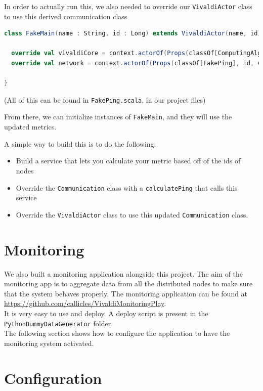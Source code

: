\documentclass[11pt,a4paper]{article}
\begin{document}
In order to actually run this, we also needed to override our \verb|VivaldiActor| class to use this derived communication class

\begin{lstlisting}[language=scala]
class FakeMain(name : String, id : Long) extends VivaldiActor(name, id) {

  override val vivaldiCore = context.actorOf(Props(classOf[ComputingAlgorithm], self, deltaConf), "VivaldiCore"+id)
  override val network = context.actorOf(Props(classOf[FakePing], id, vivaldiCore, self), "Network"+id)

}
\end{lstlisting}

(All of this can be found in \verb|FakePing.scala|, in our project files)

From there, we can initialize instances of \verb|FakeMain|, and they will use the updated metrics.

A simple way to build this is to do the following: 
\begin{itemize}
\item Build a service that lets you calculate your metric based off of the ids of nodes 
\item Override the \verb|Communication| class with a \verb|calculatePing| that calls this service
\item Override the \verb|VivaldiActor| class to use this updated \verb|Communication| class.
\end{itemize}

\section{Monitoring}
We also built a monitoring application alongside this project. The aim of the monitoring app is to aggregate data from all the distributed nodes to make sure that the system behaves properly. The monitoring application can be found at \href{https://github.com/callicles/VivaldiMonitoringPlay}{https://github.com/callicles/VivaldiMonitoringPlay}.\\

It is very easy to use and deploy. A deploy script is present in the  \texttt{PythonDummyDataGenerator} folder.\\

The following section shows how to configure the application to have the monitoring system activated.\\

\section{Configuration}
\end{document}

